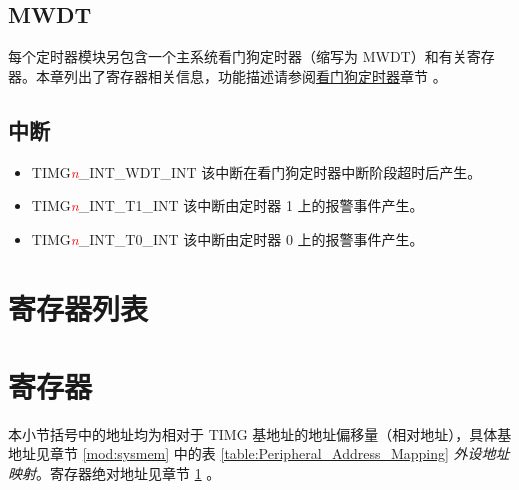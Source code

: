\documentclass[main\_\_CN.tex]{subfiles}
\begin{document}
\subsection{MWDT}
每个定时器模块另包含一个主系统看门狗定时器（缩写为 MWDT）和有关寄存器。本章列出了寄存器相关信息，功能描述请参阅\hyperref[mod:wdt]{看门狗定时器}章节 。

\subsection{中断}
\begin{itemize}
\item \label{int:TIMERSINTWDTINT}TIMG\textcolor{red}{\it{n}}\_INT\_WDT\_INT 该中断在看门狗定时器中断阶段超时后产生。
\item \label{int:TIMERSINTT1INT}TIMG\textcolor{red}{\it{n}}\_INT\_T1\_INT 该中断由定时器 1 上的报警事件产生。
\item \label{int:TIMERSINTT0INT}TIMG\textcolor{red}{\it{n}}\_INT\_T0\_INT 该中断由定时器 0 上的报警事件产生。
\end{itemize}

\hypertarget{timg-reg-summ}{}
\section{寄存器列表}\label{sec:timg-reg-summ}

{\clearpage}
\section{寄存器}\label{timer_registers}
本小节括号中的地址均为相对于 TIMG 基地址的地址偏移量（相对地址），具体基地址见章节 \ref{mod:sysmem} \textit{} 中的表 \ref{table:Peripheral_Address_Mapping} \textit{外设地址映射}。寄存器绝对地址见章节 \ref{sec:timg-reg-summ} \textit{}。

\end{document}
